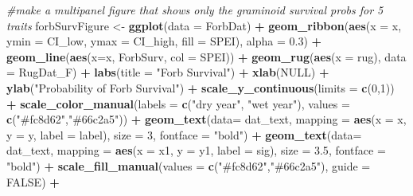 \documentclass[
]{article}
\newenvironment{Shaded}{\begin{snugshade}}{\end{snugshade}}
\newcommand{\CommentTok}[1]{\textcolor[rgb]{0.56,0.35,0.01}{\textit{#1}}}
\newcommand{\DataTypeTok}[1]{\textcolor[rgb]{0.13,0.29,0.53}{#1}}
\newcommand{\DecValTok}[1]{\textcolor[rgb]{0.00,0.00,0.81}{#1}}
\newcommand{\FloatTok}[1]{\textcolor[rgb]{0.00,0.00,0.81}{#1}}
\newcommand{\KeywordTok}[1]{\textcolor[rgb]{0.13,0.29,0.53}{\textbf{#1}}}
\newcommand{\NormalTok}[1]{#1}
\newcommand{\OperatorTok}[1]{\textcolor[rgb]{0.81,0.36,0.00}{\textbf{#1}}}
\newcommand{\OtherTok}[1]{\textcolor[rgb]{0.56,0.35,0.01}{#1}}
\newcommand{\StringTok}[1]{\textcolor[rgb]{0.31,0.60,0.02}{#1}}
\begin{document}
\begin{Shaded}
\begin{Highlighting}[]
\CommentTok{\#make a multipanel figure that shows only the graminoid survival probs for 5 traits}
\NormalTok{forbSurvFigure \textless{}{-}}\StringTok{ }\KeywordTok{ggplot}\NormalTok{(}\DataTypeTok{data =}\NormalTok{ ForbDat) }\OperatorTok{+}
\StringTok{  }\KeywordTok{geom\_ribbon}\NormalTok{(}\KeywordTok{aes}\NormalTok{(}\DataTypeTok{x =}\NormalTok{ x, }\DataTypeTok{ymin =}\NormalTok{ CI\_low, }\DataTypeTok{ymax =}\NormalTok{ CI\_high, }\DataTypeTok{fill =}\NormalTok{ SPEI), }\DataTypeTok{alpha =} \FloatTok{0.3}\NormalTok{) }\OperatorTok{+}
\StringTok{  }\KeywordTok{geom\_line}\NormalTok{(}\KeywordTok{aes}\NormalTok{(}\DataTypeTok{x=}\NormalTok{x, ForbSurv, }\DataTypeTok{col =}\NormalTok{ SPEI))  }\OperatorTok{+}\StringTok{ }
\StringTok{  }\KeywordTok{geom\_rug}\NormalTok{(}\KeywordTok{aes}\NormalTok{(}\DataTypeTok{x =}\NormalTok{ rug), }\DataTypeTok{data =}\NormalTok{ RugDat\_F) }\OperatorTok{+}
\StringTok{  }\KeywordTok{labs}\NormalTok{(}\DataTypeTok{title =} \StringTok{"Forb Survival"}\NormalTok{) }\OperatorTok{+}
\StringTok{  }\KeywordTok{xlab}\NormalTok{(}\OtherTok{NULL}\NormalTok{) }\OperatorTok{+}
\StringTok{  }\KeywordTok{ylab}\NormalTok{(}\StringTok{"Probability of Forb Survival"}\NormalTok{) }\OperatorTok{+}
\StringTok{  }\KeywordTok{scale\_y\_continuous}\NormalTok{(}\DataTypeTok{limits =} \KeywordTok{c}\NormalTok{(}\DecValTok{0}\NormalTok{,}\DecValTok{1}\NormalTok{)) }\OperatorTok{+}
\StringTok{  }\KeywordTok{scale\_color\_manual}\NormalTok{(}\DataTypeTok{labels =} \KeywordTok{c}\NormalTok{(}\StringTok{"dry year"}\NormalTok{, }\StringTok{"wet year"}\NormalTok{), }\DataTypeTok{values =} \KeywordTok{c}\NormalTok{(}\StringTok{"\#fc8d62"}\NormalTok{,}\StringTok{"\#66c2a5"}\NormalTok{)) }\OperatorTok{+}
\StringTok{  }\KeywordTok{geom\_text}\NormalTok{(}\DataTypeTok{data=}\NormalTok{ dat\_text, }\DataTypeTok{mapping =} \KeywordTok{aes}\NormalTok{(}\DataTypeTok{x =}\NormalTok{ x, }\DataTypeTok{y =}\NormalTok{ y, }\DataTypeTok{label =}\NormalTok{ label), }\DataTypeTok{size =} \DecValTok{3}\NormalTok{, }\DataTypeTok{fontface =} \StringTok{"bold"}\NormalTok{) }\OperatorTok{+}
\StringTok{  }\KeywordTok{geom\_text}\NormalTok{(}\DataTypeTok{data=}\NormalTok{ dat\_text, }\DataTypeTok{mapping =} \KeywordTok{aes}\NormalTok{(}\DataTypeTok{x =}\NormalTok{ x1, }\DataTypeTok{y =}\NormalTok{ y1, }\DataTypeTok{label =}\NormalTok{ sig), }\DataTypeTok{size =} \FloatTok{3.5}\NormalTok{, }\DataTypeTok{fontface =} \StringTok{"bold"}\NormalTok{) }\OperatorTok{+}
\StringTok{  }\KeywordTok{scale\_fill\_manual}\NormalTok{(}\DataTypeTok{values =} \KeywordTok{c}\NormalTok{(}\StringTok{"\#fc8d62"}\NormalTok{,}\StringTok{"\#66c2a5"}\NormalTok{), }\DataTypeTok{guide =} \OtherTok{FALSE}\NormalTok{) }\OperatorTok{+}

\end{Highlighting}
\end{Shaded}
\end{document}
